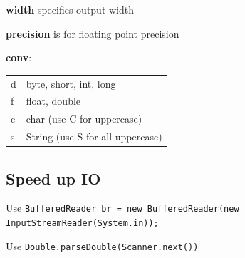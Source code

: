 \documentclass[10pt,a4paper,ngerman,oneside,]{article}
\begin{document}
\textbf{width} specifies output width

\textbf{precision} is for floating point precision

\textbf{conv}: \\ \begin{tabular}{ll}
  d & byte, short, int, long \\
  f & float, double \\
  c & char (use C for uppercase) \\
  s & String (use S for all uppercase)
\end{tabular}

\subsection{Speed up IO}
Use \texttt{BufferedReader br = new BufferedReader(new
InputStreamReader(System.in));}

Use \texttt{Double.parseDouble(Scanner.next())}




\end{document}
